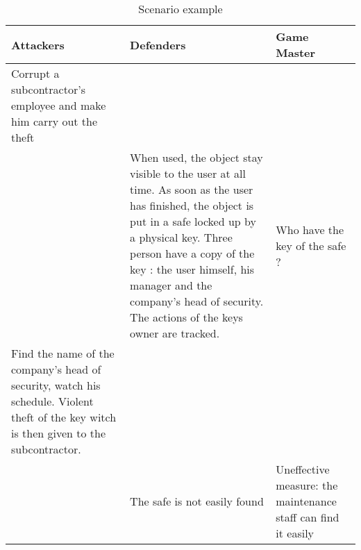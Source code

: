 \documentclass[11pt]{article} %
\begin{document}
\begin{longtable}{|p{4cm}|p{4cm}|p{4cm}|}
\caption[Scenario example]{Scenario example}\\

\hline
Attackers & Defenders & Game Master \\
\hline
\endhead

\hline \endfoot
          
Corrupt a subcontractor's employee and make him carry out the theft && \\
& When used, the object stay visible to the user at all time. As soon as the user
 has finished, the object is put in a safe locked up by a physical key. Three person have 
a copy of the key : the user himself, his manager and the company's head 
of security. The actions of the keys owner are tracked. &
Who have the key of the safe ? \\
Find the name of the company's head of security, watch his schedule. 
Violent theft of the key witch is then given to the subcontractor. && \\
& The safe is not easily found & 
Uneffective measure: the maintenance staff can find it easily \\

\end{longtable}
\end{document}
